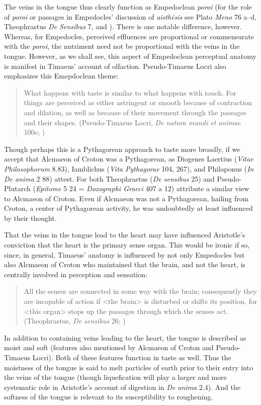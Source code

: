 The veins in the tongue thus clearly function as Empedoclean \emph{poroi} (for the role of \emph{poroi} or passages in Empedocles' discussion of \emph{aisthēsis} see Plato \emph{Meno} 76 a--d, Theophrastus \emph{De Sensibus} 7, and \citealt{Beare:1906uq}). There is one notable difference, however. Whereas, for Empedocles, perceived effluences are proportional or commensurate with the \emph{poroi}, the nutriment need not be proportional with the veins in the tongue. However, as we shall see, this aspect of Empedoclean perceptual anatomy is manifest in Timaeus' account of olfaction. Pseudo-Timaeus Locri also emphasizes this Emepdoclean theme: 
\begin{quote}
	What happens with taste is similar to what happens with touch. For things are perceived as either astringent or smooth because of contraction and dilation, as well as because of their movement through the passages and their shapes. (Pseudo-Timaeus Locri, \emph{De natura mundi et animae} 100e; \citealt[59]{Tobin:1984qf})
\end{quote}
Though perhaps this is a Pythagorean approach to taste more broadly, if we accept that Alcmaeon of Croton was a Pythagorean, as Diogenes Laertius (\emph{Vitae Philosophorum} 8.83), Iamblichus (\emph{Vita Pythagorae} 104, 267), and Philoponus (\emph{In De anima} 2 88) attest. For both Theophrastus (\emph{De sensibus} 25) and Pseudo-Plutarch (\emph{Epitome} 5 24 = \emph{Doxographi Graeci} 407 a 12) attribute a similar view to Alcmaeon of Croton. Even if Alcmaeon was not a Pythagorean, hailing from Croton, a center of Pythagorean activity, he was undoubtedly at least influenced by their thought.

That the veins in the tongue lead to the heart may have influenced Aristotle's conviction that the heart is the primary sense organ. This would be ironic if so, since, in general, Timaeus' anatomy is influenced by not only Empedocles but also Alcmaeon of Croton who maintained that the brain, and not the heart, is centrally involved in perception and sensation:
\begin{quote}
	All the senses are connected in some way with the brain; consequently they are incapable of action if <the brain> is disturbed or shifts its position, for <this organ> stops up the passages through which the senses act. (Theophrastus, \emph{De sensibus} 26; \citealt[89--91]{Stratton:1917vn})
\end{quote}

In addition to containing veins leading to the heart, the tongue is described as moist and soft (features also mentioned by Alcmaeon of Croton and Pseudo-Timaeus Locri). Both of these features function in taste as well. Thus the moistness of the tongue is said to melt particles of earth prior to their entry into the veins of the tongue (though liquefication will play a larger and more systematic role in Aristotle's account of digestion in \emph{De anima} 2.4). And the softness of the tongue is relevant to its susceptibility to roughening.

